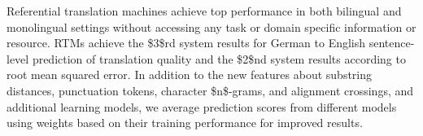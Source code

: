 Referential translation machines achieve top performance in both bilingual and monolingual settings without accessing any task or domain specific information or resource. RTMs achieve the \$3\$rd system results for German to English sentence-level prediction of translation quality and the \$2\$nd system results according to root mean squared error. In addition to the new features about substring distances, punctuation tokens, character \$n\$-grams, and alignment crossings, and additional learning models, we average prediction scores from different models using weights based on their training performance for improved results.
